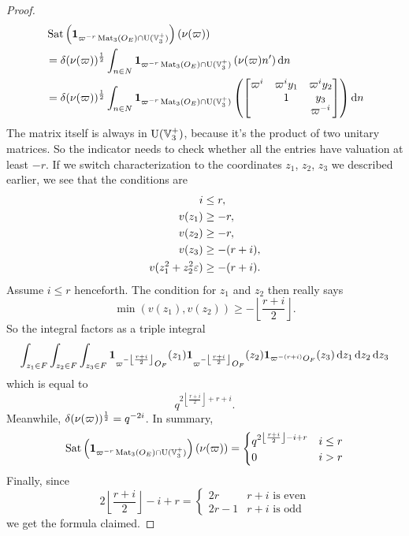 \begin{proof}
\begin{align*}
    &\Sat\left( \mathbf{1}_{\varpi^{-r} \Mat_3(\OO_E) \cap \U(\VV_3^+)}\right)
      \left( \nu(\varpi)  \right) \\
    &= \delta(\nu(\varpi))^\half \int_{n \in N}
      \mathbf{1}_{\varpi^{-r} \Mat_3(\OO_E) \cap \U(\VV_3^+)}
      \left( \nu(\varpi) n' \right) \odif n \\
    &= \delta(\nu(\varpi))^\half \int_{n \in N}
      \mathbf{1}_{{\varpi^{-r}} \Mat_3(\OO_E) \cap \U(\VV_3^+)}
      \left( \begin{bmatrix} \varpi^i & \varpi^i y_1 & \varpi^i y_2 \\
               & 1 & y_3 \\
               & & \varpi^{-i} \end{bmatrix} \right) \odif n
  \end{align*}
  The matrix itself is always in $\operatorname{U}(\mathbb V_3^+)$, because it's the product of two unitary matrices.
  So the indicator needs to check whether all the entries have valuation at least $-r$.
  If we switch characterization to the coordinates $z_1$, $z_2$, $z_3$ we described earlier,
  we see that the conditions are
  \begin{align*}
    i &\le r, \\
    v(z_1) &\ge -r, \\
    v(z_2) &\ge -r,\\
    v(z_3) &\ge -(r+i),\\
    v(z_1^2 + z_2^2 \varepsilon) &\ge -(r+i).
  \end{align*}
  Assume $i \le r$ henceforth.
  The condition for $z_1$ and $z_2$ then really says
  \[ \min(v(z_1), v(z_2)) \ge -\left\lfloor \frac{r+i}{2} \right\rfloor. \]
  So the integral factors as a triple integral
  \[
    \int_{z_1 \in F}
    \int_{z_2 \in F}
    \int_{z_3 \in F}
    \mathbf{1}_{\varpi^{-\left\lfloor \frac{r+i}{2} \right\rfloor} \OO_F}(z_1)
    \mathbf{1}_{\varpi^{-\left\lfloor \frac{r+i}{2} \right\rfloor} \OO_F}(z_2)
    \mathbf{1}_{\varpi^{-(r+i)} \OO_F}(z_3)
    \odif{z_1,z_2,z_3}
  \]
  which is equal to
  \[ q^{2\left\lfloor \frac{r+i}{2} \right\rfloor+r+i}. \]
  Meanwhile, $\delta(\nu(\varpi))^{\frac{1}{2}} = q^{-2i}$.
  In summary,
  \[
    \operatorname{Sat}\left( \mathbf{1}_{\varpi^{-r} \operatorname{Mat}_3(O_E) \cap \operatorname{U}(\mathbb V_3^+)}\right) \left( \nu(\varpi) \right)
    =
    \begin{cases}
      q^{2\left\lfloor \frac{r+i}{2} \right\rfloor - i + r} & i \le r \\
      0 & i > r
    \end{cases}
  \]
  Finally, since
  \[ 2\left\lfloor \frac{r+i}{2} \right\rfloor - i + r
    = \begin{cases}
      2r & r+i \text{ is even} \\
      2r-1 & r+i \text{ is odd}
    \end{cases}
  \]
  we get the formula claimed.
\end{proof}

